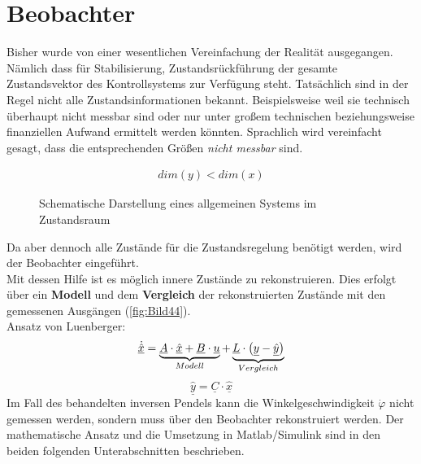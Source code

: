 \section{Beobachter}

Bisher wurde von einer wesentlichen Vereinfachung der Realität ausgegangen. Nämlich dass für Stabilisierung, Zustandsrückführung \etc der gesamte Zustandsvektor des Kontrollsystems zur Verfügung steht. Tatsächlich sind in der Regel nicht alle Zustandsinformationen bekannt. Beispielsweise weil sie technisch überhaupt nicht messbar sind oder nur unter großem technischen beziehungsweise finanziellen Aufwand ermittelt werden könnten. Sprachlich wird
vereinfacht gesagt, dass die entsprechenden Größen \textit{nicht messbar} sind.

\begin{align*}
    dim(y) < dim(x)
\end{align*}

\begin{figure}[H]
    \centering
    \caption[Allgemeines System im Zustandsraum]{Schematische Darstellung eines allgemeinen Systems im Zustandsraum}
    \label{fig:Bild43}
\end{figure}

Da aber dennoch alle Zustände für die Zustandsregelung benötigt werden, wird der Beobachter eingeführt.\\
Mit dessen Hilfe ist es möglich innere Zustände zu rekonstruieren. Dies erfolgt über ein \textbf{Modell} und dem \textbf{Vergleich} der rekonstruierten Zustände mit den gemessenen Ausgängen (\autoref{fig:Bild44}).\\
\newline
Ansatz von Luenberger:
\[
    \underline{\dot{\hat{x}}} = 
    \underbrace{%
        \underline{A} \cdot \underline{\hat{x}} + \underline{B} \cdot \underline{u}
    }_{%
    Modell
    }
    + 
    \underbrace{%
    \underline{L} \cdot\left( \underline{y} - \underline{\hat{y}}\right)
    }_{%
    Vergleich
    }
\]
\[
    \underline{\hat{y}} = \underline{C} \cdot \underline{\hat{x}}
\]
\newline
Im Fall des behandelten inversen Pendels kann die Winkelgeschwindigkeit $\dot{\varphi}$ nicht gemessen werden, sondern muss über den Beobachter rekonstruiert werden. Der mathematische Ansatz und die Umsetzung in Matlab/Simulink sind in den beiden folgenden Unterabschnitten beschrieben.

